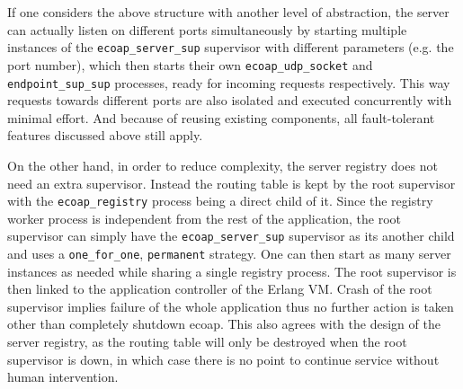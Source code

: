 If one considers the above structure with another level of abstraction, the server can actually listen on different ports simultaneously by starting multiple instances of the \verb|ecoap_server_sup| supervisor with different parameters (e.g. the port number), which then starts their own \verb|ecoap_udp_socket| and \verb|endpoint_sup_sup| processes, ready for incoming requests respectively. This way requests towards different ports are also isolated and executed concurrently with minimal effort. And because of reusing existing components, all fault-tolerant features discussed above still apply.

On the other hand, in order to reduce complexity, the server registry does not need an extra supervisor. Instead the routing table is kept by the root supervisor with the \verb|ecoap_registry| process being a direct child of it. Since the registry worker process is independent from the rest of the application, the root supervisor can simply have the \verb|ecoap_server_sup| supervisor as its another child and uses a \verb|one_for_one|, \verb|permanent| strategy. One can then start as many server instances as needed while sharing a single registry process. The root supervisor is then linked to the application controller of the Erlang VM. Crash of the root supervisor implies failure of the whole application thus no further action is taken other than completely shutdown ecoap. This also agrees with the design of the server registry, as the routing table will only be destroyed when the root supervisor is down, in which case there is no point to continue service without human intervention.



